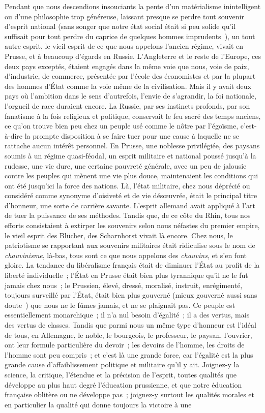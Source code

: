 \documentclass[french,twoside]{book} %
\begin{document}
Pendant que nous descendions insouciants la pente d’un matérialisme inintelligent ou d’une philosophie trop généreuse, laissant presque se perdre tout souvenir d’esprit national (sans songer que notre état social était si peu solide qu’il suffisait pour tout perdre du caprice de quelques hommes imprudents ), un tout autre esprit, le vieil esprit de ce que nous appelons l’ancien régime, vivait en Prusse, et à beaucoup d’égards en Russie. L’Angleterre et le reste de l’Europe, ces deux pays exceptés, étaient engagés dans la même voie que nous, voie de paix, d’industrie, de commerce, présentée par l’école des économistes et par la plupart des hommes d’État comme la voie même de la civilisation. Mais il y avait deux pays où l’ambition dans le sens d’autrefois, l’envie de s’agrandir, la foi nationale, l’orgueil de race duraient encore. La Russie, par ses instincts profonds, par son fanatisme à la fois religieux et politique, conservait le feu sacré des temps anciens, ce qu’on trouve bien peu chez un peuple usé comme le nôtre par l’égoïsme, c’est-à-dire la prompte disposition à se faire tuer pour une cause à laquelle ne se rattache aucun intérêt personnel. En Prusse, une noblesse privilégiée, des paysans soumis à un régime quasi-féodal, un esprit militaire et national poussé jusqu’à la rudesse, une vie dure, une certaine pauvreté générale, avec un peu de jalousie contre les peuples qui mènent une vie plus douce, maintenaient les conditions qui ont été jusqu’ici la force des nations. Là, l’état militaire, chez nous déprécié ou considéré comme synonyme d’oisiveté et de vie désœuvrée, était le principal titre d’honneur, une sorte de carrière savante. L’esprit allemand avait appliqué à l’art de tuer la puissance de ses méthodes. Tandis que, de ce côte du Rhin, tous nos efforts consistaient à extirper les souvenirs selon nous néfastes du premier empire, le vieil esprit des Blücher, des Scharnhorst vivait là encore. Chez nous, le patriotisme se rapportant aux souvenirs militaires était ridiculise sous le nom de {\itshape chauvinisme}, là-bas, tous sont ce que nous appelons des {\itshape chauvins}, et s’en font gloire. La tendance du libéralisme français était de diminuer l’État au profit de la liberté individuelle ; l’État en Prusse était bien plus tyrannique qu’il ne le fut jamais chez nous ; le Prussien, élevé, dressé, moralisé, instruit, enrégimenté, toujours surveillé par l’État, était bien plus gouverné (mieux gouverné aussi sans doute ) que nous ne le fûmes jamais, et ne se plaignait pas. Ce peuple est essentiellement monarchique ; il n’a nul besoin d’égalité ; il a des vertus, mais des vertus de classes. Tandis que parmi nous un même type d’honneur est l’idéal de tous, en Allemagne, le noble, le bourgeois, le professeur, le paysan, l’ouvrier, ont leur formule particulière du devoir ; les devoirs de l’homme, les droits de l’homme sont peu compris ; et c’est là une grande force, car l’égalité est la plus grande cause d’affaiblissement politique et militaire qu’il y ait. Joignez-y la science, la critique, l’étendue et la précision de l’esprit, toutes qualités que développe au plus haut degré l’éducation prussienne, et que notre éducation française oblitère ou ne développe pas ; joignez-y surtout les qualités morales et en particulier la qualité qui donne toujours la victoire à une 
\end{document}
